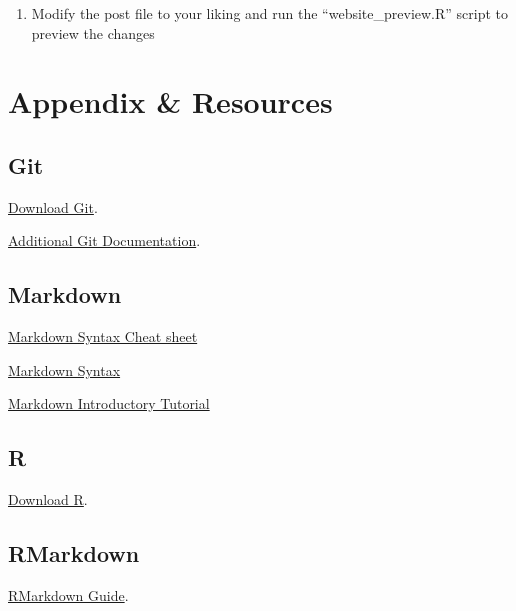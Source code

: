 \documentclass[
]{book}
\providecommand{\tightlist}{%
  \setlength{\itemsep}{0pt}\setlength{\parskip}{0pt}}
\begin{document}
\begin{enumerate}
\def\labelenumi{\arabic{enumi}.}
\setcounter{enumi}{2}
\tightlist
\item
  Modify the post file to your liking and run the ``website\_preview.R'' script to preview the changes
\end{enumerate}

\hypertarget{appendix-resources}{%
\chapter*{Appendix \& Resources}\label{appendix-resources}}

\hypertarget{git}{%
\section*{Git}\label{git}}

\href{https://git-scm.com/downloads}{Download Git}.

\href{https://git-scm.com/doc}{Additional Git Documentation}.

\hypertarget{markdown}{%
\section*{Markdown}\label{markdown}}

\href{https://www.markdownguide.org/cheat-sheet/}{Markdown Syntax Cheat sheet}

\href{https://www.markdownguide.org/basic-syntax}{Markdown Syntax}

\href{https://www.markdowntutorial.com/lesson/1/}{Markdown Introductory Tutorial}

\hypertarget{r}{%
\section*{R}\label{r}}

\href{https://cloud.r-project.org/}{Download R}.

\hypertarget{rmarkdown}{%
\section*{RMarkdown}\label{rmarkdown}}

\href{https://bookdown.org/yihui/rmarkdown/}{RMarkdown Guide}.
\end{document}
